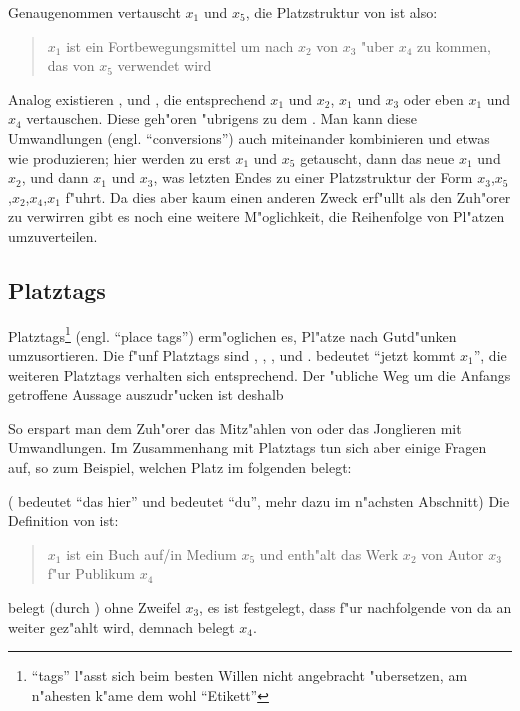 Genaugenommen vertauscht  $x_1$ und $x_5$, die Platzstruktur von  ist also:
\begin{quote}
$x_1$ ist ein Fortbewegungsmittel um nach $x_2$ von $x_3$ "uber $x_4$ zu kommen, das von $x_5$ verwendet wird
\end{quote}

Analog existieren ,  und , die entsprechend $x_1$ und $x_2$, $x_1$ und $x_3$ oder eben $x_1$ und $x_4$ vertauschen. Diese  geh"oren "ubrigens
zu dem  .
Man kann diese Umwandlungen (engl. ``conversions'') auch miteinander kombinieren und etwas wie  produzieren; hier werden zu erst $x_1$ und $x_5$ getauscht, dann
das neue $x_1$ und $x_2$, und dann $x_1$ und $x_3$, was letzten Endes zu einer Platzstruktur der Form $x_3$,$x_5$,$x_2$,$x_4$,$x_1$ f"uhrt.
Da dies aber kaum einen anderen Zweck erf"ullt als den Zuh"orer zu verwirren gibt es noch eine weitere M"oglichkeit, die Reihenfolge von Pl"atzen umzuverteilen.

\subsection{Platztags}
Platztags\footnote{``tags'' l"asst sich beim besten Willen nicht angebracht "ubersetzen, am n"ahesten k"ame dem wohl ``Etikett''} (engl. ``place tags'') erm"oglichen es, Pl"atze
nach Gutd"unken umzusortieren. Die f"unf Platztags sind , , ,  und .  bedeutet ``jetzt kommt $x_1$'', die weiteren Platztags 
verhalten sich entsprechend.
Der "ubliche Weg um die Anfangs getroffene Aussage auszudr"ucken ist deshalb
\begin{quote}
\end{quote}
So erspart man dem Zuh"orer das Mitz"ahlen von  oder das Jonglieren mit Umwandlungen.
Im Zusammenhang mit Platztags tun sich aber einige Fragen auf, so zum Beispiel, welchen Platz  im folgenden  belegt:
\begin{quote}
\end{quote}
( bedeutet ``das hier'' und  bedeutet ``du'', mehr dazu im n"achsten Abschnitt)
Die Definition von  ist:
\begin{quote}
$x_1$ ist ein Buch auf/in Medium $x_5$ und enth"alt das Werk $x_2$ von Autor $x_3$ f"ur Publikum $x_4$
\end{quote}
 belegt (durch ) ohne Zweifel $x_3$, es ist festgelegt, dass f"ur nachfolgende  von da an weiter gez"ahlt wird, demnach belegt  $x_4$.

